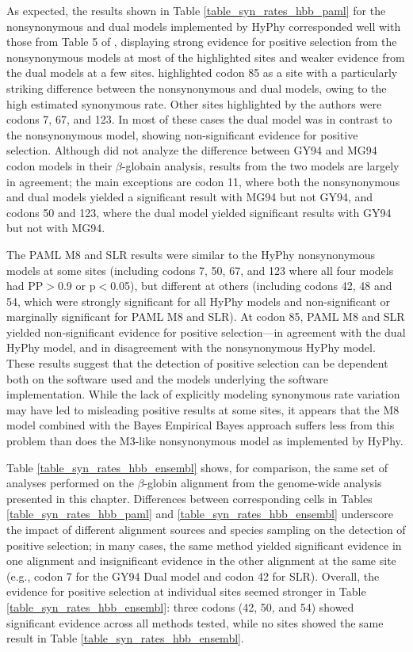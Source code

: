 As expected, the results shown in Table \ref{table_syn_rates_hbb_paml}
for the nonsynonymous and dual models implemented by HyPhy
corresponded well with those from Table 5 of \citet{Pond2005b},
displaying strong evidence for positive selection from the
nonsynonymous models at most of the highlighted sites and weaker
evidence from the dual models at a few sites. \citet{Pond2005b}
highlighted codon 85 as a site with a particularly striking difference
between the nonsynonymous and dual models, owing to the high estimated
synonymous rate. Other sites highlighted by the authors were codons 7,
67, and 123. In most of these cases the dual model was in contrast to
the nonsynonymous model, showing non-significant evidence for positive
selection. Although \citet{Pond2005b} did not analyze the difference
between GY94 and MG94 codon models in their $\beta$-globain analysis,
results from the two models are largely in agreement; the main
exceptions are codon 11, where both the nonsynonymous and dual models
yielded a significant result with MG94 but not GY94, and codons 50 and
123, where the dual model yielded significant results with GY94 but
not with MG94.

The PAML M8 and SLR results were similar to the HyPhy nonsynonymous
models at some sites (including codons 7, 50, 67, and 123 where all
four models had PP$>$0.9 or p$<$0.05), but different at others (including
codons 42, 48 and 54, which were strongly significant for all HyPhy
models and non-significant or marginally significant for PAML M8 and
SLR). At codon 85, PAML M8 and SLR yielded non-significant evidence
for positive selection---in agreement with the dual HyPhy model, and
in disagreement with the nonsynonymous HyPhy model. These results
suggest that the detection of positive selection can be dependent both
on the software used and the models underlying the software
implementation. While the lack of explicitly modeling synonymous rate
variation may have led to misleading positive results at some sites,
it appears that the M8 model combined with the Bayes Empirical Bayes
approach suffers less from this problem than does the M3-like
nonsynonymous model as implemented by HyPhy.

Table \ref{table_syn_rates_hbb_ensembl} shows, for comparison, the
same set of analyses performed on the $\beta$-globin alignment from
the genome-wide analysis presented in this chapter. Differences
between corresponding cells in Tables \ref{table_syn_rates_hbb_paml}
and \ref{table_syn_rates_hbb_ensembl} underscore the impact of
different alignment sources and species sampling on the detection of
positive selection; in many cases, the same method yielded significant
evidence in one alignment and insignificant evidence in the other
alignment at the same site (e.g., codon 7 for the GY94 Dual model and
codon 42 for SLR). Overall, the evidence for positive selection at
individual sites seemed stronger in Table
\ref{table_syn_rates_hbb_ensembl}: three codons (42, 50, and 54)
showed significant evidence across all methods tested, while no sites
showed the same result in Table \ref{table_syn_rates_hbb_ensembl}.


